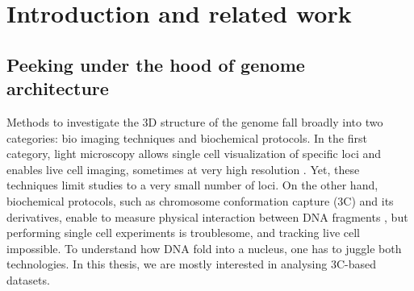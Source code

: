 

\chapter{Introduction and related work}

\graphicspath{{1_introduction/}}

\begin{abstract}{Résumé}

L'architecture spatiale et temporelle du génome joue un rôle important dans
beaucoup de fonctions génomiques, mais est cependant à l'heure actuelle peu
comprise. Le développement récent du protocol Hi-C, qui permet en une seule
expérience de mesurer les fréquences d'interactions entre paire de loci sur
tout le génome, ouvre la porte à une étude plus systématique de la structure
tridimensionnelle du génome. Dans ce chapitre, nous introduisons les concepts
sous-jacents à la capture de la conformation des chromosomes, la structure de
l'ADN et aux méthodes d'inférence de l'architecture 3D du génome.

\end{abstract}

\begin{abstract}{Abstract}

The spatial and temporal genome architecture is thought to play an important
role in many genomic functions, but is yet poorly understood. Recently, the
development of the Hi-C protocol, which allows in a single experiments to
assess genome wide physical interactions between pairs of loci, has paved the
way for a systematic analysis of the 3D structure of DNA. We aim in this
chapter at providing some background on chromosome conformation capture, the
structure of DNA and the field of 3D architecture inference.

\end{abstract}


\section{Peeking under the hood of genome architecture}

Methods to investigate the 3D structure of the genome fall broadly into two
categories: bio imaging techniques and biochemical protocols. In the first
category, light microscopy allows single cell visualization of specific loci
and enables live cell imaging, sometimes at very high resolution
\citep{cremer:chromosome-2010}. Yet, these techniques limit studies to a very
small number of loci. On the other hand, biochemical protocols, such as
chromosome conformation capture (3C) and its derivatives, enable to measure
physical interaction between DNA fragments \citep{dekker:capturing}, but
performing single cell experiments is troublesome, and tracking live cell
impossible. To understand how DNA fold into a nucleus, one has to juggle
both technologies. In this thesis, we are mostly interested in
analysing 3C-based datasets.

